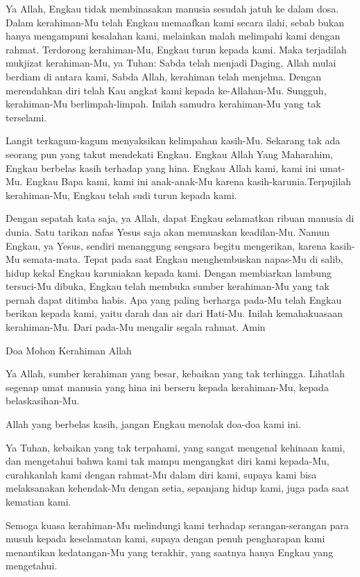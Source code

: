 \documentclass[a5paper,headsepline,titlepage,11pt,nnormalheadings,DIVcalc]{scrbook}
\begin{document}
Ya Allah, Engkau tidak membinasakan manusia sesudah jatuh ke dalam dosa. Dalam kerahiman-Mu telah Engkau memaafkan kami secara ilahi, sebab bukan hanya mengampuni kesalahan kami, melainkan malah melimpahi kami dengan rahmat. Terdorong kerahiman-Mu, Engkau turun kepada kami. Maka terjadilah mukjizat kerahiman-Mu, ya Tuhan: Sabda telah menjadi Daging, Allah mulai berdiam di antara kami, Sabda Allah, kerahiman telah menjelma.
Dengan merendahkan diri telah Kau angkat kami kepada ke-Allahan-Mu. Sungguh, kerahiman-Mu berlimpah-limpah. Inilah samudra kerahiman-Mu yang tak terselami.

Langit terkagum-kagum menyaksikan kelimpahan kasih-Mu.
Sekarang tak ada seorang pun yang takut mendekati Engkau. Engkau Allah Yang Maharahim, Engkau berbelas kasih terhadap yang hina. Engkau Allah kami, kami ini umat-Mu. Engkau Bapa kami, kami ini anak-anak-Mu karena kasih-karunia.Terpujilah kerahiman-Mu, Engkau telah sudi turun kepada kami.

Dengan sepatah kata saja, ya Allah, dapat Engkau selamatkan ribuan manusia di dunia. Satu tarikan nafas Yesus saja akan memuaskan keadilan-Mu. Namun Engkau, ya Yesus, sendiri menanggung sengsara begitu mengerikan, karena kasih-Mu semata-mata. Tepat pada saat Engkau menghembuskan napas-Mu di salib, hidup kekal Engkau karuniakan kepada kami. Dengan membiarkan lambung tersuci-Mu dibuka, Engkau telah membuka sumber kerahiman-Mu yang tak pernah dapat ditimba habis. Apa yang paling berharga pada-Mu telah Engkau berikan kepada kami, yaitu darah dan air dari Hati-Mu. Inilah kemahakuasaan kerahiman-Mu. Dari pada-Mu mengalir segala rahmat. Amin

Doa Mohon Kerahiman Allah

Ya Allah, sumber kerahiman yang besar, kebaikan yang tak terhingga. Lihatlah segenap umat manusia yang hina ini berseru kepada kerahiman-Mu, kepada belaskasihan-Mu.

Allah yang berbelas kasih, jangan Engkau menolak doa-doa kami ini.

Ya Tuhan, kebaikan yang tak terpahami, yang sangat mengenal kehinaan kami, dan mengetahui bahwa kami tak mampu mengangkat diri kami kepada-Mu, curahkanlah kami dengan rahmat-Mu dalam diri kami, supaya kami bisa melaksanakan kehendak-Mu dengan setia, sepanjang hidup kami, juga pada saat kematian kami.

Semoga kuasa kerahiman-Mu melindungi kami terhadap serangan-serangan para musuh kepada keselamatan kami, supaya dengan penuh pengharapan kami menantikan kedatangan-Mu yang terakhir, yang saatnya hanya Engkau yang mengetahui.
\end{document}
